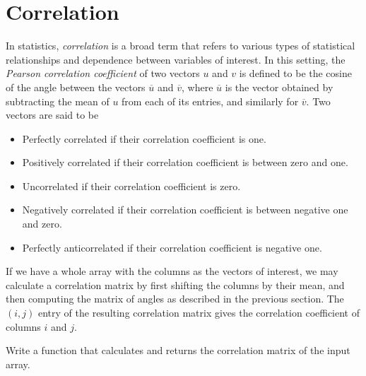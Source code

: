 
\section*{Correlation}
In statistics, \emph{correlation} is a broad term that refers to various types of statistical relationships and dependence between
variables of interest.
In this setting, the \emph{Pearson correlation coefficient} of two vectors $u$ and $v$ is defined to be the cosine of the angle between the
vectors $\overline{u}$ and $\overline{v}$, where $\overline{u}$ is the vector obtained by subtracting the mean of $u$ from each of its entries,
and similarly for $\overline{v}$.
Two vectors are said to be
\begin{itemize}
\item Perfectly correlated if their correlation coefficient is one.
\item Positively correlated if their correlation coefficient is between zero and one.
\item Uncorrelated if their correlation coefficient is zero.
\item Negatively correlated if their correlation coefficient is between negative one and zero.
\item Perfectly anticorrelated if their correlation coefficient is negative one.
\end{itemize}

If we have a whole array with the columns as the vectors of interest, we may calculate a correlation matrix
by first shifting the columns by their mean, and then computing the matrix of angles as described in the
previous section. The $(i,j)$ entry of the resulting correlation matrix gives the correlation coefficient
of columns $i$ and $j$.

\begin{problem}
Write a function  that calculates and returns the correlation matrix of the input array.
\end{problem}

